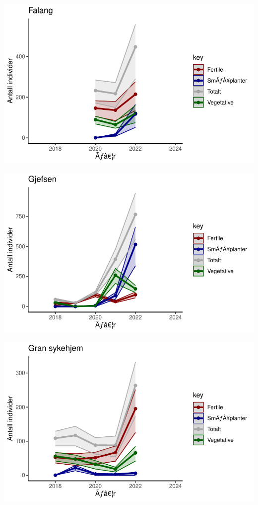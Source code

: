 \documentclass[
  letterpaper,
  DIV=11,
  numbers=noendperiod]{scrreport}
\begin{document}
\includegraphics{localEst_files/figure-pdf/unnamed-chunk-3-2.pdf}

\includegraphics{localEst_files/figure-pdf/unnamed-chunk-3-3.pdf}

\includegraphics{localEst_files/figure-pdf/unnamed-chunk-3-4.pdf}
\end{document}
